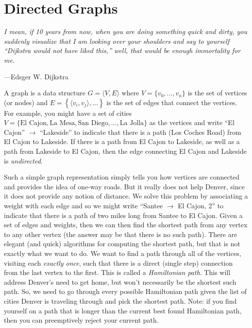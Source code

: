 \section{Directed Graphs}

\epigraph{\emph{I mean, if 10 years from now, when you are doing
something quick and dirty, you suddenly visualize that I am looking over
your shoulders and say to yourself ``Dijkstra would not have liked
this,'' well, that would be enough immortality for me.}}{%
---Edsger W.\xspace Dijkstra}

\noindent A graph is a data structure $G = \langle V, E \rangle$ where
$V = \{ v_0, \ldots, v_n \}$ is the set of vertices (or nodes) and $E =
\left \{ \langle v_i,v_j \rangle, \ldots \right \}$ is the set of edges
that connect the vertices. For example, you might have a set of cities
$V = \{ \text{El Cajon}, \text{La Mesa}, \text{San Diego}, \ldots,
\text{La Jolla} \}$ as the vertices and write ``El Cajon'' $\rightarrow$
``Lakeside'' to indicate that there is a path (Los Coches Road) from El
Cajon to Lakeside. If there is a path from El Cajon to Lakeside, as well
as a path from Lakeside to El Cajon, then the edge connecting El Cajon
and Lakeside is \emph{undirected}.


Such a simple graph representation simply tells you how vertices are
connected and provides the idea of one-way roads. But it really does not
help Denver, since it does not provide any notion of distance. We solve
this problem by associating a weight with each edge and so we might
write ``Santee $\rightarrow$ El Cajon, 2'' to indicate that there is a
path of two miles long from Santee to El Cajon. Given a set of edges and
weights, then we can then find the shortest path from any vertex to any
other vertex (the answer may be that there is no such path). There are
elegant (and quick) algorithms for computing the shortest path, but that
is not exactly what we want to do. We want to find a path through all
of the vertices, visiting each \emph{exactly once}, such that there is a
direct (single step) connection from the last vertex to the first. This
is called a \emph{Hamiltonian path}. This will address Denver's need to
get home, but won't necessarily be the shortest such path. So, we need
to go through every possible Hamiltonian path given the list of cities
Denver is traveling through and pick the shortest path. Note: if you
find yourself on a path that is longer than the current best found
Hamiltonian path, then you can preemptively reject your current path.

